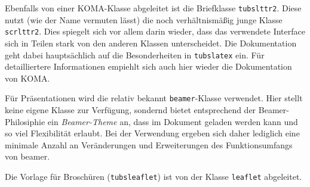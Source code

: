 Ebenfalls von einer KOMA-Klasse abgeleitet ist die Briefklasse
\texttt{tubslttr2}.
Diese nutzt (wie der Name vermuten lässt) die noch verhältnismäßig junge
Klasse \texttt{scrlttr2}. Dies spiegelt sich vor allem darin wieder, dass
das verwendete Interface sich in Teilen stark von den anderen Klassen unterscheidet. Die Dokumentation geht dabei hauptsächlich auf die Besonderheiten in \texttt{tubslatex} ein. Für detailliertere Informationen empiehlt sich auch hier wieder die Dokumentation von KOMA\cite{koma-skript}.

Für Präsentationen wird die relativ bekannt \texttt{beamer}-Klasse verwendet. Hier stellt \tubslatex keine eigene Klasse zur Verfügung, sondernd bietet entsprechend der Beamer-Philosiphie ein \emph{Beamer-Theme} an, dass
im Dokument geladen werden kann und so viel Flexibilität erlaubt.
Bei der Verwendung ergeben sich daher lediglich eine minimale Anzahl an
Veränderungen und Erweiterungen des Funktionsumfangs von beamer.

Die Vorlage für Broschüren (\texttt{tubsleaflet}) ist
von der Klasse \texttt{leaflet} abgeleitet.\par


